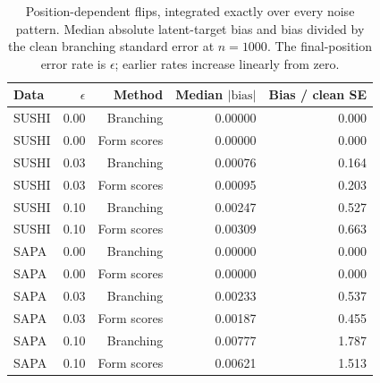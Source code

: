 \begin{table}[t]
\centering
\caption{Position-dependent flips, integrated exactly over every noise pattern. Median absolute latent-target bias and bias divided by the clean branching standard error at $n=1000$. The final-position error rate is $\epsilon$; earlier rates increase linearly from zero.}
\label{tab:measurement}
\small
\setlength{\tabcolsep}{4pt}
\begin{tabular}{lrrrr}
\toprule
Data & $\epsilon$ & Method & Median $|\mathrm{bias}|$ & Bias / clean SE \\
\midrule
SUSHI & 0.00 & Branching & 0.00000 & 0.000 \\
SUSHI & 0.00 & Form scores & 0.00000 & 0.000 \\
SUSHI & 0.03 & Branching & 0.00076 & 0.164 \\
SUSHI & 0.03 & Form scores & 0.00095 & 0.203 \\
SUSHI & 0.10 & Branching & 0.00247 & 0.527 \\
SUSHI & 0.10 & Form scores & 0.00309 & 0.663 \\
SAPA & 0.00 & Branching & 0.00000 & 0.000 \\
SAPA & 0.00 & Form scores & 0.00000 & 0.000 \\
SAPA & 0.03 & Branching & 0.00233 & 0.537 \\
SAPA & 0.03 & Form scores & 0.00187 & 0.455 \\
SAPA & 0.10 & Branching & 0.00777 & 1.787 \\
SAPA & 0.10 & Form scores & 0.00621 & 1.513 \\
\bottomrule
\end{tabular}
\end{table}
